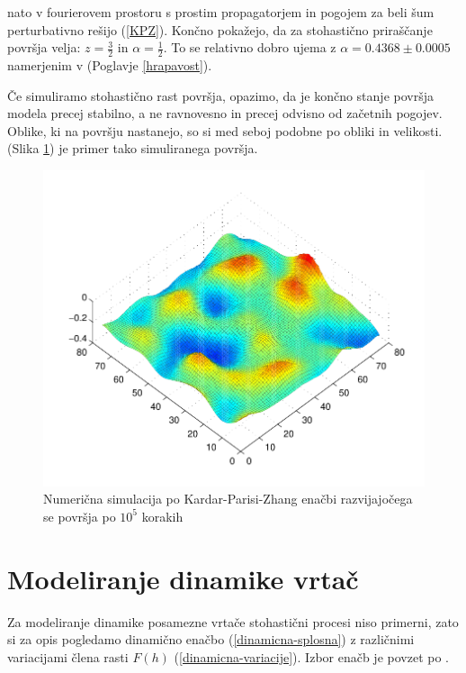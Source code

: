 \documentclass[a4paper, twoside, 12pt]{book}
\begin{document}
            \cite{kardar1986dynamic} nato v fourierovem prostoru s prostim propagatorjem in pogojem za beli šum perturbativno rešijo (\ref{KPZ}). Končno pokažejo, da za stohastično priraščanje površja velja: $z = \frac{3}{2}$ in $\alpha=\frac{1}{2}$. To se relativno dobro ujema z $\alpha=0.4368 \pm 0.0005$ namerjenim v (Poglavje \ref{hrapavost}).


            Če simuliramo stohastično rast površja, opazimo, da je končno stanje površja modela precej stabilno, a ne ravnovesno in precej odvisno od začetnih pogojev. Oblike, ki na površju nastanejo, so si med seboj podobne po obliki in velikosti. (Slika \ref{fig:KPZ-numericno}) je primer tako simuliranega površja.

            \begin{figure}[h]
              \begin{center}
                \includegraphics[width=13cm]{slike/KPZ-numericno}
              \end{center}
              \caption{Numerična simulacija po Kardar-Parisi-Zhang enačbi razvijajočega se površja po $10^5$ korakih}
              \label{fig:KPZ-numericno}
            \end{figure}


            \section{Modeliranje dinamike vrtač}

            Za modeliranje dinamike posamezne vrtače stohastični procesi niso primerni, zato si za opis pogledamo dinamično enačbo (\ref{dinamicna-splosna}) z različnimi variacijami člena rasti $F(h)$ (\ref{dinamicna-variacije}). Izbor enačb je povzet po \cite{kandler2010population}.
\end{document}
